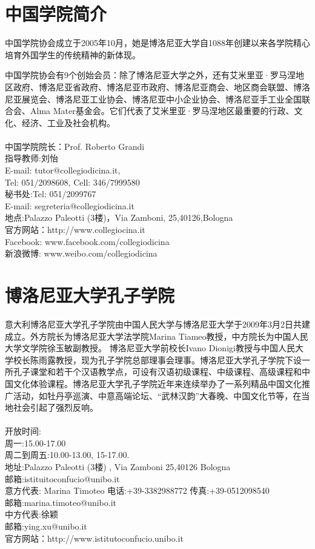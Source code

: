 \section{中国学院简介}


         中国学院协会成立于2005年10月，她是博洛尼亚大学自1088年创建以来各学院精心培育外国学生的传统精神的新体现。

          中国学院协会有9个创始会员：除了博洛尼亚大学之外，还有艾米里亚·罗马涅地区政府、博洛尼亚省政府、博洛尼亚市政府、博洛尼亚商会、地区商会联盟、博洛尼亚展览会、博洛尼亚工业协会、博洛尼亚中小企业协会、博洛尼亚手工业全国联合会、Alma Mater基金会。它们代表了艾米里亚·罗马涅地区最重要的行政、文化、经济、工业及社会机构。\\\\
          \noindent 中国学院院长：Prof. Roberto Grandi\\
          指导教师:刘怡\\
		   E-mail: tutor@collegiodicina.it, \\
		   Tel: 051/2098608, Cell: 346/7999580 \\
		   秘书处:Tel: 051/2099767\\
		   E-mail: segreteria@collegiodicina.it\\
			地点:Palazzo Paleotti (3楼)，Via Zamboni, 25,40126,Bologna\\
官方网站：http://www.collegiocina.it\\
Facebook: www.facebook.com/collegiodicina\\
新浪微博: www.weibo.com/collegiodicina

\section{博洛尼亚大学孔子学院}

意大利博洛尼亚大学孔子学院由中国人民大学与博洛尼亚大学于2009年3月2日共建成立。外方院长为博洛尼亚大学法学院Marina Tiameo教授，中方院长为中国人民大学文学院徐玉敏副教授。 博洛尼亚大学前校长Ivano Dionigi教授与中国人民大学校长陈雨露教授，现为孔子学院总部理事会理事。博洛尼亚大学孔子学院下设一所孔子课堂和若干个汉语教学点，可设有汉语初级课程、中级课程、高级课程和中国文化体验课程。博洛尼亚大学孔子学院近年来连续举办了一系列精品中国文化推广活动，如牡丹亭巡演、中意高端论坛、“武林汉韵”大春晚、中国文化节等，在当地社会引起了强烈反响。\\\\
 \noindent 开放时间:\\
周一:15.00-17.00\\
周二到周五:10.00-13.00, 15-17.00.\\
地址:Palazzo Paleotti (3楼) , Via Zamboni 25,40126 Bologna \\
邮箱:istituitoconfucio@unibo.it \\
意方代表: Marina Timoteo 电话:+39-3382988772 传真:+39-0512098540\\
邮箱:marina.timoteo@unibo.it \\
中方代表:徐颖\\
邮箱:ying.xu@unibo.it  \\
官方网站：http://www.istitutoconfucio.unibo.it

